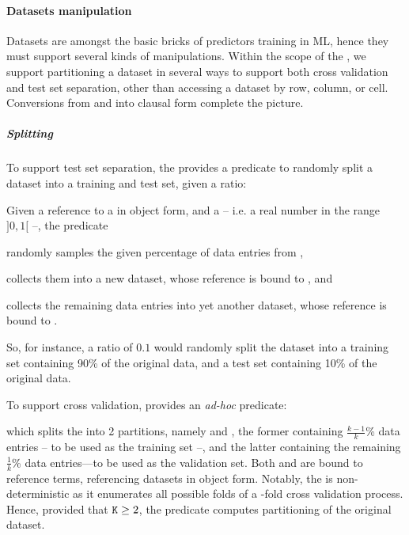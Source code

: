 \documentclass[12pt,a4paper,openright,twoside]{book}
\begin{document}
\paragraph{Datasets manipulation}

Datasets are amongst the basic bricks of predictors training in ML, hence they must support several kinds of manipulations.
%
Within the scope of the \mllib{}, we support partitioning a dataset in several ways to support both cross validation and test set separation, other than accessing a dataset by row, column, or cell.
%
Conversions from and into clausal form complete the picture.

\subparagraph{Splitting}

To support test set separation, the \mllib{} provides a predicate to randomly split a dataset into a training and test set, given a ratio:
%
\begin{center}
\end{center}
%
Given a reference to a  in object form, and a  -- i.e. a real number in the range $]0,1[$ --, the predicate
%
\begin{inlinelist}
    \item randomly samples the given percentage of data entries from ,
    \item collects them into a new dataset, whose reference is bound to , and
    \item collects the remaining data entries into yet another dataset, whose reference is bound to .
\end{inlinelist}
%
So, for instance, a ratio of $0.1$ would randomly split the dataset into a training set containing 90\% of the original data, and a test set containing 10\% of the original data.

To support cross validation, \mllib{} provides an \textit{ad-hoc} predicate:
%
\begin{center}
\end{center}
%
which splits the  into 2 partitions, namely  and , the former containing $\frac{k-1}{k}$\% data entries -- to be used as the training set --, and the latter containing the remaining $\frac{1}{k}$\% data entries---to be used as the validation set.
%
Both  and  are bound to reference terms, referencing datasets in object form.
%
Notably, the  is non-deterministic as it enumerates all possible folds of a -fold cross validation process.
%
Hence, provided that $\texttt{K} \geq 2$, the predicate computes  partitioning of the original dataset.
\end{document}
